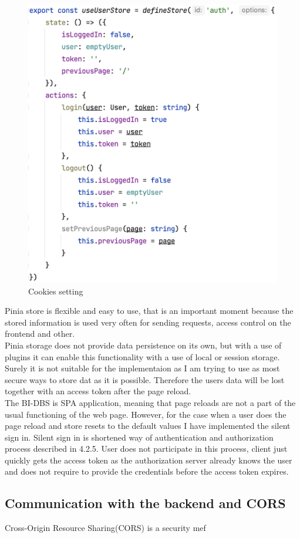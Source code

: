 \begin{figure}[h]
\centering
\includegraphics[scale=0.52]{../png/pinia_user.png}
\caption{Cookies setting}
\end{figure}

\noindent Pinia store is flexible and easy to use, that is an important moment because the stored information is used very often for sending requests, access control on the frontend and other.\\
Pinia storage does not provide data persistence on its own, but with a use of plugins it can enable this functionality with a use of local or session storage. Surely it is not suitable for the implementaion as I am trying to use as most secure ways to store dat as it is possible. Therefore the users data will be lost together with an access token after the page reload.\\
The BI-DBS is SPA application, meaning that page reloads are not a part of the usual functioning of the web page. However, for the case when a user does the page reload and store resets to the default values I have implemented the silent sign in. Silent sign in is shortened way of authentication and authorization process described in 4.2.5. User does not participate in this process, client just quickly gets the access token as the authorization server already knows the user and does not require to provide the credentials before the access token expires. 

\subsection{Communication with the backend and CORS}
Cross-Origin Resource Sharing(CORS) is a security mef


